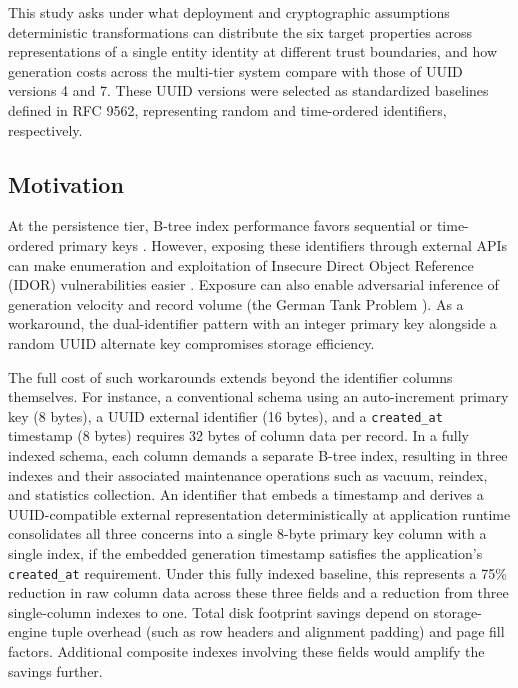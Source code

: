 \documentclass[a4paper,fleqn]{cas-sc}
\begin{document}
This study asks under what deployment and cryptographic assumptions
deterministic transformations can distribute the six target properties
across representations of a single entity identity at different trust
boundaries, and how generation costs across the multi-tier system
compare with those of UUID versions 4 and 7. These UUID versions were
selected as standardized baselines defined in RFC 9562, representing
random and time-ordered identifiers, respectively.

\subsection{Motivation}\label{motivation}

At the persistence tier, B-tree index performance favors sequential or
time-ordered primary keys \citep[Sections 2.1, 6.11, and 6.13]{rfc9562}.
However, exposing these identifiers through external APIs can make
enumeration and exploitation of Insecure Direct Object Reference (IDOR)
vulnerabilities easier \citep{cwe639}. Exposure can also enable
adversarial inference of generation velocity and record volume (the
German Tank Problem \citep{ruggles1947}). As a workaround, the
dual-identifier pattern with an integer primary key alongside a random
UUID alternate key compromises storage efficiency.

The full cost of such workarounds extends beyond the identifier columns
themselves. For instance, a conventional schema using an auto-increment
primary key (8 bytes), a UUID external identifier (16 bytes), and a
\texttt{created\_at} timestamp (8 bytes) requires 32 bytes of column
data per record. In a fully indexed schema, each column demands a
separate B-tree index, resulting in three indexes and their associated
maintenance operations such as vacuum, reindex, and statistics
collection. An identifier that embeds a timestamp and derives a
UUID-compatible external representation deterministically at application
runtime consolidates all three concerns into a single 8-byte primary key
column with a single index, if the embedded generation timestamp
satisfies the application's \texttt{created\_at} requirement. Under this
fully indexed baseline, this represents a 75\% reduction in raw column
data across these three fields and a reduction from three single-column
indexes to one. Total disk footprint savings depend on storage-engine
tuple overhead (such as row headers and alignment padding) and page fill
factors. Additional composite indexes involving these fields would
amplify the savings further.
\end{document}
